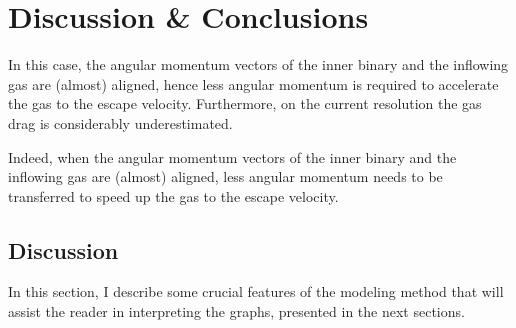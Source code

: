 \chapter{Discussion \& Conclusions}\label{discussion}










In this case, the angular momentum vectors of the inner binary and the inflowing gas are (almost) aligned, hence less angular momentum is required to accelerate the gas to the escape velocity. Furthermore, on the current resolution the gas drag is considerably underestimated.

Indeed, when the angular momentum vectors of the inner binary and the inflowing gas are (almost) aligned, less angular momentum needs to be transferred to speed up the gas to the escape velocity.







\section{Discussion}

In this section, I describe some crucial features of the modeling method that will assist the reader in interpreting the graphs, presented in the next sections. 